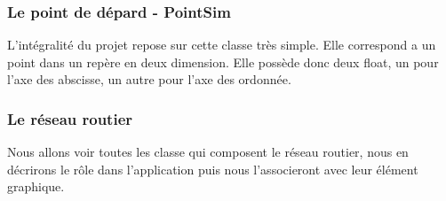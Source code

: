 \documentclass[a4paper,11pt]{article}
\begin{document}
\subsubsection{Le point de dépard - PointSim}

L'intégralité du projet repose sur cette classe très simple. Elle correspond a un point dans un repère en deux dimension. Elle possède donc deux float, un pour l'axe des abscisse, un autre pour l'axe des ordonnée. 

\subsubsection{Le réseau routier}

Nous allons voir toutes les classe qui composent le réseau routier, nous en décrirons le rôle dans l'application puis nous l'associeront avec leur élément graphique.\\
\end{document}
